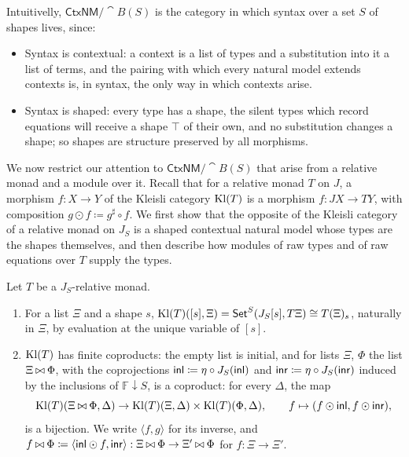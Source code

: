 Intuitivelly, $\mathsf{CtxNM}/\cat{B}(S)$ is the category in which syntax over a set $S$ of shapes lives, since:
\begin{itemize}
    \item Syntax is contextual: a context is a list of types and a substitution into it a list of terms, and the pairing with which every natural model extends contexts is, in syntax, the only way in which contexts arise.
    \item Syntax is shaped: every type has a shape, the silent types which record equations will receive a shape $\top$ of their own, and no substitution changes a shape; so shapes are structure preserved by all morphisms.
\end{itemize}

We now restrict our attention to $\mathsf{CtxNM}/\cat{B}(S)$ that arise from a relative monad and a module over it. Recall that for a relative monad $T$ on $J$, a morphism $f : X \to Y$ of the Kleisli category $\mathrm{Kl}(T)$ is a morphism $f : JX \to TY$, with composition $g \odot f \coloneqq g^\sharp \circ f$. We first show that the opposite of the Kleisli category of a relative monad on $J_S$ is a shaped contextual natural model whose types are the shapes themselves, and then describe how modules of raw types and of raw equations over $T$ supply the types.

\begin{lemma}\label{lem:kleisli-coproducts}
    Let $T$ be a $J_S$-relative monad.
    \begin{enumerate}
        \item For a list $\Xi$ and a shape $s$, $\mathrm{Kl}(T)([s], \Xi) = \mathsf{Set}^S(J_S[s], T\Xi) \cong T(\Xi)_s$, naturally in $\Xi$, by evaluation at the unique variable of $[s]$.
        \item $\mathrm{Kl}(T)$ has finite coproducts: the empty list is initial, and for lists $\Xi$, $\Phi$ the list $\Xi \mathbin{\bowtie} \Phi$, with the coprojections $\mathsf{inl} \coloneqq \eta \circ J_S(\mathsf{inl})$ and $\mathsf{inr} \coloneqq \eta \circ J_S(\mathsf{inr})$ induced by the inclusions of $\mathbb{F}{\downarrow}S$, is a coproduct: for every $\Delta$, the map
        \[
            \mathrm{Kl}(T)(\Xi \mathbin{\bowtie} \Phi, \Delta) \to \mathrm{Kl}(T)(\Xi, \Delta) \times \mathrm{Kl}(T)(\Phi, \Delta), \qquad f \mapsto (f \odot \mathsf{inl}, f \odot \mathsf{inr}),
        \]
        is a bijection. We write $\langle f, g \rangle$ for its inverse, and $f \mathbin{\bowtie} \Phi \coloneqq \langle \mathsf{inl} \odot f, \mathsf{inr} \rangle : \Xi \mathbin{\bowtie} \Phi \to \Xi' \mathbin{\bowtie} \Phi$ for $f : \Xi \to \Xi'$.
    \end{enumerate}
\end{lemma}

